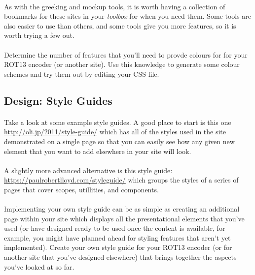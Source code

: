 \documentclass[10pt, a4paper, twosize]{article}
\begin{document}
\paragraph{} As with the greeking and mockup tools, it is worth having a collection of bookmarks for these sites in your \emph{toolbox} for when you need them. Some tools are also easier to use than others, and some tools give you more features, so it is worth trying a few out.

\paragraph{} Determine the number of features that you'll need to provde colours for for your ROT13 encoder (or another site). Use this knowledge to generate some colour schemes and try them out by editing your CSS file.


\subsection{Design: Style Guides}
\paragraph{} Take a look at some example style guides. A good place to start is this one \url{http://oli.jp/2011/style-guide/} which has all of the styles used in the site demonstrated on a single page so that you can easily see how any given new element that you want to add elsewhere in your site will look.

\paragraph{} A slightly more advanced alternative is this style guide: \url{https://paulrobertlloyd.com/styleguide/} which groups the styles of a series of pages that cover scopes, utillities, and components.

\paragraph{} Implementing your own style guide can be as simple as creating an additional page within your site which displays all the presentational elements that you've used (or have designed ready to be used once the content is available, for example, you might have planned ahead for styling features that aren't yet implemented). Create your own style guide for your ROT13 encoder (or for another site that you've designed elsewhere) that brings together the aspects you've looked at so far.
\end{document}
